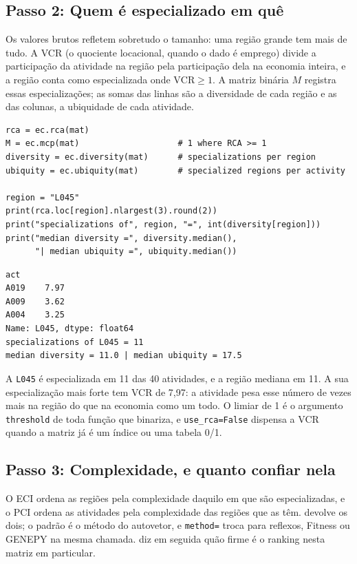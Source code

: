 \subsection{Passo 2: Quem é especializado em quê}

Os valores brutos refletem sobretudo o tamanho: uma região grande
tem mais de tudo. A VCR (o quociente locacional, quando o dado é
emprego) divide a participação da atividade na região pela participação
dela na economia inteira, e a região conta como especializada onde
$\text{VCR} \geq 1$. A matriz binária $M$ registra essas
especializações; as somas das linhas são a diversidade de cada região e
as das colunas, a ubiquidade de cada atividade.

\begin{lstlisting}
rca = ec.rca(mat)
M = ec.mcp(mat)                    # 1 where RCA >= 1
diversity = ec.diversity(mat)      # specializations per region
ubiquity = ec.ubiquity(mat)        # specialized regions per activity

region = "L045"
print(rca.loc[region].nlargest(3).round(2))
print("specializations of", region, "=", int(diversity[region]))
print("median diversity =", diversity.median(),
      "| median ubiquity =", ubiquity.median())
\end{lstlisting}
\begin{lstlisting}[language={}, numbers=none, backgroundcolor=\color{white}, frame=leftline, framerule=2pt, rulecolor=\color{noteborder}, xleftmargin=1.5em]
act
A019    7.97
A009    3.62
A004    3.25
Name: L045, dtype: float64
specializations of L045 = 11
median diversity = 11.0 | median ubiquity = 17.5
\end{lstlisting}

A \texttt{L045} é especializada em 11 das 40
atividades, e a região mediana em 11. A sua
especialização mais forte tem VCR de 7{,}97: a
atividade pesa esse número de vezes mais na região do que na economia
como um todo. O limiar de 1 é o argumento \texttt{threshold} de toda
função que binariza, e \texttt{use\_rca=False} dispensa a VCR quando a
matriz já é um índice ou uma tabela 0/1.

\subsection{Passo 3: Complexidade, e quanto confiar nela}

O ECI ordena as regiões pela complexidade daquilo em que são
especializadas, e o PCI ordena as atividades pela complexidade das
regiões que as têm.  devolve os dois; o padrão é o método
do autovetor, e \texttt{method=} troca para reflexos, Fitness ou GENEPY
na mesma chamada.  diz em seguida quão firme é o
ranking nesta matriz em particular.

